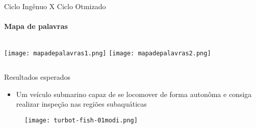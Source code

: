 \begin{frame}[t]{Ciclo Ingênuo X Ciclo Otmizado}
    \transboxout[duration=0.5]
    \framesubtitle{Mapa de palavras}
    
    \begin{columns}
        \newline  
            \texttt{[image: mapadepalavras1.png]}
        \newline  
         \texttt{[image: mapadepalavras2.png]}
    \end{columns}
    
\end{frame}
\begin{frame}[c]{Resultados esperados}
    \begin{itemize}
        \item Um veículo submarino capaz de se locomover de forma autonôma e consiga realizar inspeção 
        nas regiões subaquáticas
        
    \end{itemize}

    \begin{figure}
        \texttt{[image: turbot-fish-01modi.png]}
    \end{figure}
\end{frame}
